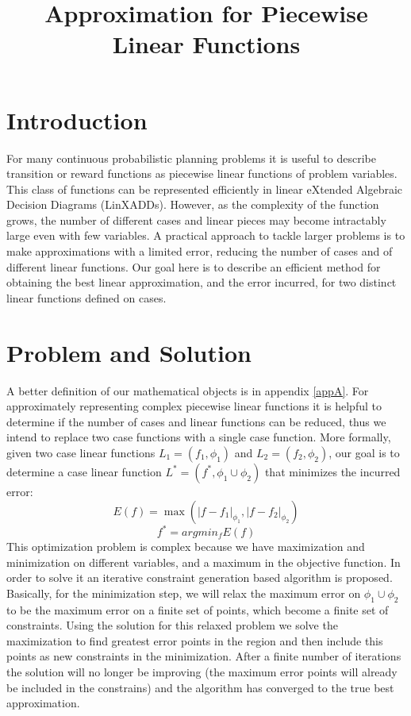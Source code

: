 \title{Approximation for Piecewise Linear Functions}
 
\section*{Introduction}
For many continuous probabilistic planning problems it is useful to describe transition or reward functions as piecewise linear functions of problem variables. This class of functions can be represented efficiently in linear eXtended Algebraic Decision Diagrams (LinXADDs). However, as the complexity of the function grows, the number of different cases and linear pieces may become intractably large even with few variables. A practical approach to tackle larger problems is to make approximations with a limited error, reducing the number of cases and of different linear functions. Our goal here is to describe an efficient method for obtaining the best linear approximation, and the error incurred, for two distinct linear functions defined on cases.

\section{Problem and Solution} 
\label{probSol} 
A better definition of our mathematical objects is in appendix \ref{appA}. For approximately representing complex piecewise linear functions it is helpful to determine if the number of cases and linear functions can be reduced, thus we intend to replace two case functions with a single case function. More formally, given two case linear functions $L_1 = ( f_1, \phi_1 )$ and $L_2 = ( f_2, \phi_2 )$, our goal is to determine a case linear function $L^* = (f^*,\phi_1 \cup  \phi_2)$ that minimizes the incurred  error:
$$ E(f) = \max ( |f - f_1|_{\phi_1} , |f - f_2|_{\phi_2} )$$
$$f^* = argmin_f E(f) $$
This optimization problem is complex because we have maximization and minimization on different variables, and a maximum in the objective function.
In order to solve it an iterative constraint generation based algorithm is proposed. Basically, for the minimization step, we will relax the maximum error on $\phi_1 \cup \phi_2$ to be the maximum error on a finite set of points, which become a finite set of constraints.  Using the solution for this relaxed problem we solve the maximization to find greatest error points in the region and then include this points as new constraints in the minimization. After a finite number of iterations the solution will no longer be improving (the maximum error points will already be included in the constrains) and the algorithm has converged to the true best approximation.

